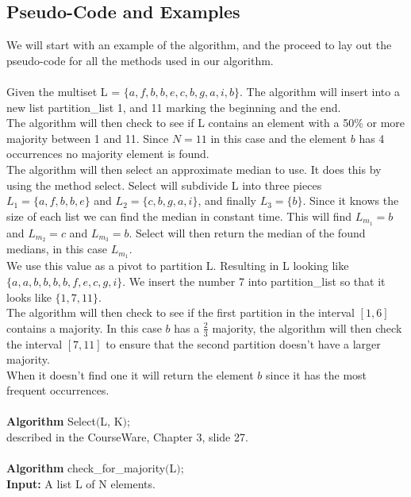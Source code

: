 \documentclass{article}
\begin{document}
    \subsection{Pseudo-Code and Examples}
      We will start with an example of the algorithm, and the proceed to lay out the pseudo-code for all the methods used in our algorithm. \\
      \\
      Given the multiset L = $\{a, f, b, b, e, c, b, g, a, i, b\}$. The algorithm will insert into a new list partition\_list 1, and 11 marking the beginning and the end.\\
      The algorithm will then check to see if L contains an element with a 50\% or more majority between 1 and 11. Since $N = 11$ in this case and the element $b$ has 4 occurrences no majority element is found. \\
      The algorithm will then select an approximate median to use. It does this by using the method select. Select will subdivide L into three pieces $L_{1} = \{a, f, b, b, e\}$ and $L_{2} = \{c, b, g, a, i\}$, and finally $L_{3} = \{b\}$. Since it knows the size of each list we can find the median in constant time. This will find $L_{m_{1}} = b$ and $L_{m_{2}} = c$ and $L_{m_{3}} = b$. Select will then return the median of the found medians, in this case $L_{m_{1}}$.\\
      We use this value as a pivot to partition L. Resulting in L looking like $\{a, a, b, b, b, b, f, e, c, g, i \}$. We insert the number 7 into partition\_list so that it looks like $\{1, 7, 11\}$. \\
      The algorithm will then check to see if the first partition in the interval $[1, 6]$ contains a majority. In this case $b$ has a $\frac{2}{3}$ majority, the algorithm will then check the interval $[7, 11]$ to ensure that the second partition doesn't have a larger majority. \\
      When it doesn't find one it will return the element $b$ since it has the most frequent occurrences. \\
      \\
      \textbf{Algorithm} Select$($L, K$)$; \\
      \indent described in the CourseWare, Chapter 3, slide 27. \\
      \\
      \textbf{Algorithm} check\_for\_majority$($L$)$; \\
      \textbf{Input:} A list L of N elements. \\
\end{document}
